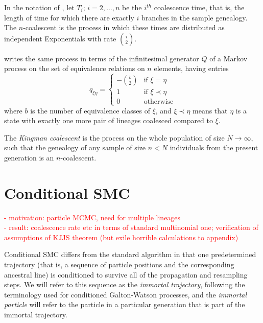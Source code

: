 \documentclass[fleqn]{article}
\begin{document}
In the notation of \citet{wakeley2009}, let $T_i;\, i=2,\dots,n$ be the $i^{th}$ coalescence time, that is, the length of time for which there are exactly $i$ branches in the sample genealogy. The $n$-coalescent is the process in which these times are distributed as independent Exponentials with rate $\binom{i}{2}$.


\citet{mohle1998} writes the same process in terms of the infinitesimal generator $Q$ of a Markov process on the set of equivalence relations on $n$ elements, having entries
\begin{equation*}
q_{\xi\eta} =
\begin{cases}
-\binom{b}{2} &\text{if }\xi=\eta \\
1 & \text{if }\xi \prec\eta \\
0 & \text{otherwise}
\end{cases}
\end{equation*}
where $b$ is the number of equivalence classes of $\xi$, and $\xi \prec \eta$ means that $\eta$ is a state with exactly one more pair of lineages coalesced compared to $\xi$.
 
The \emph{Kingman coalescent} is the process on the whole population of size $N\to\infty$, such that the genealogy of any sample of size $n<N$ individuals from the present generation is an $n$-coalescent.

\section{Conditional SMC}
\textcolor{red}{
- motivation: particle MCMC, need for multiple lineages\\
- result: coalescence rate etc in terms of standard multinomial one; verification of assumptions of KJJS theorem (but exile horrible calculations to appendix)\\
}

Conditional SMC differs from the standard algorithm in that one predetermined trajectory (that is, a sequence of particle positions and the corresponding ancestral line) is conditioned to survive all of the propagation and resampling steps. 
We will refer to this sequence as the \emph{immortal trajectory}, following the terminology used for conditioned Galton-Watson processes, and the \emph{immortal particle} will refer to the particle in a particular generation that is part of the immortal trajectory.
\end{document}
